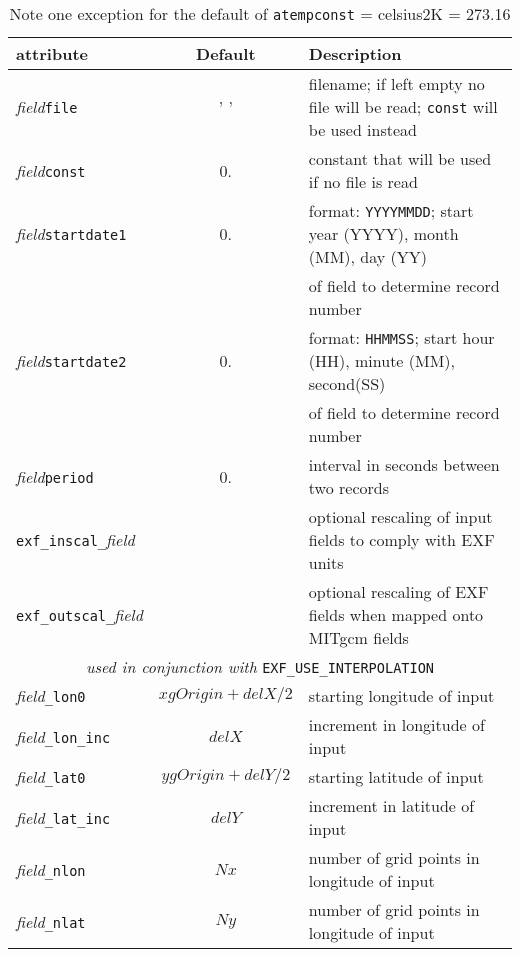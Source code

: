 \begin{table}[h!]
\centering
  \label{tab:pkg:exf:runtime_attributes}
  {\footnotesize
    \begin{tabular}{|l|c|l|}
      \hline 
      \textbf{attribute} &  \textbf{Default} &  \textbf{Description}  \\
      \hline \hline
         \textit{field}\texttt{file} & ' ' & 
           filename; if left empty no file will be read; \texttt{const} will be used instead \\
         \textit{field}\texttt{const} & 0. &
           constant that will be used if no file is read  \\
         \textit{field}\texttt{startdate1} & 0. & 
           format: \texttt{YYYYMMDD}; start year (YYYY), month (MM), day (YY) \\
           ~&~& of field to determine record number \\
         \textit{field}\texttt{startdate2} & 0. &
           format: \texttt{HHMMSS}; start hour (HH), minute (MM), second(SS) \\
           ~&~& of field to determine record number\\
         \textit{field}\texttt{period} & 0. &
           interval in seconds between two records \\
         \texttt{exf\_inscal\_}\textit{field}& ~ & 
           optional rescaling of input fields to comply with EXF units \\
         \texttt{exf\_outscal\_}\textit{field}& ~ &
           optional rescaling of EXF fields when mapped onto MITgcm fields \\
         \hline
         \multicolumn{3}{|c|}{\textit{used in conjunction with} 
                              \texttt{EXF\_USE\_INTERPOLATION}} \\
         \hline
         \textit{field}\texttt{\_lon0} & $xgOrigin+delX/2$  & 
           starting longitude of input \\
         \textit{field}\texttt{\_lon\_inc} & $delX$ &
           increment in longitude of input \\
         \textit{field}\texttt{\_lat0} &  $ygOrigin+delY/2$ &
           starting latitude of input \\
         \textit{field}\texttt{\_lat\_inc} & $delY$ &
           increment in latitude of input \\
         \textit{field}\texttt{\_nlon} & $Nx$ &
           number of grid points in longitude of input \\
         \textit{field}\texttt{\_nlat} & $Ny$ &
           number of grid points in longitude of input \\
      \hline
    \end{tabular}
   }
   \caption{\newline
            Note one exception for the default of 
            \texttt{atempconst} = celsius2K = 273.16}
\end{table}

